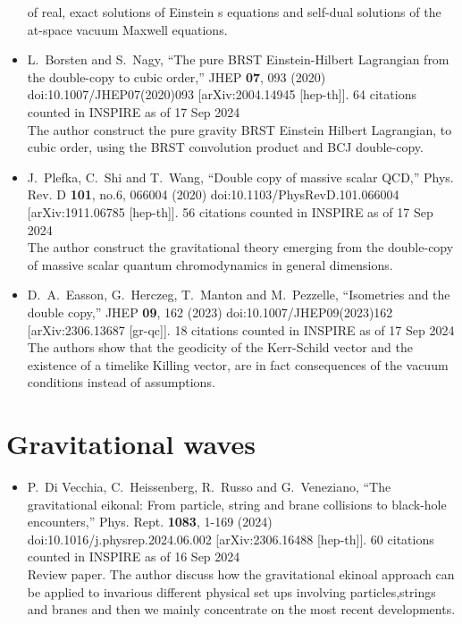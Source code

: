 \documentclass[a4paper,12pt]{article}
\begin{document}
\begin{itemize}
    of real, exact solutions of Einstein s equations and self-dual solutions of the at-space vacuum Maxwell equations.
    \item %
    L.~Borsten and S.~Nagy,
    ``The pure BRST Einstein-Hilbert Lagrangian from the double-copy to cubic order,''
    JHEP \textbf{07}, 093 (2020)
    doi:10.1007/JHEP07(2020)093
    [arXiv:2004.14945 [hep-th]].
    64 citations counted in INSPIRE as of 17 Sep 2024\\
    The author construct the pure gravity BRST Einstein Hilbert Lagrangian, to cubic order, using the BRST convolution product and BCJ double-copy.
    \item  %
    J.~Plefka, C.~Shi and T.~Wang,
    ``Double copy of massive scalar QCD,''
    Phys. Rev. D \textbf{101}, no.6, 066004 (2020)
    doi:10.1103/PhysRevD.101.066004
    [arXiv:1911.06785 [hep-th]].
    56 citations counted in INSPIRE as of 17 Sep 2024\\
    The author construct the gravitational theory emerging from the double-copy of massive scalar quantum
    chromodynamics in general dimensions. 
    \item  %
    D.~A.~Easson, G.~Herczeg, T.~Manton and M.~Pezzelle,
    ``Isometries and the double copy,''
    JHEP \textbf{09}, 162 (2023)
    doi:10.1007/JHEP09(2023)162
    [arXiv:2306.13687 [gr-qc]].
    18 citations counted in INSPIRE as of 17 Sep 2024\\
    The authors show that the geodicity of the Kerr-Schild vector and the existence of a timelike Killing vector, are in fact consequences of the vacuum conditions instead of assumptions.
\end{itemize}
\section*{Gravitational waves}
\begin{itemize}
    \item %
    P.~Di Vecchia, C.~Heissenberg, R.~Russo and G.~Veneziano,
    ``The gravitational eikonal: From particle, string and brane collisions to black-hole encounters,''
    Phys. Rept. \textbf{1083}, 1-169 (2024)
    doi:10.1016/j.physrep.2024.06.002
    [arXiv:2306.16488 [hep-th]].
    60 citations counted in INSPIRE as of 16 Sep 2024\\
    Review paper. The author discuss how the gravitational ekinoal approach can be applied to invarious different physical
    set ups involving particles,strings and branes and then we mainly concentrate on the most recent
    developments.
    
\end{itemize}
\end{document}
